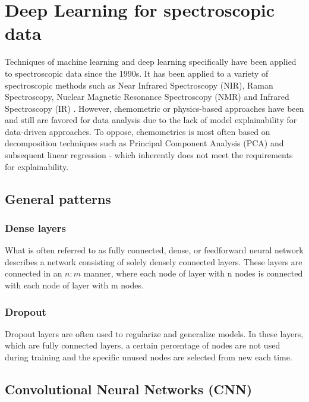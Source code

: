 \label{DL_theory}
\section{Deep Learning for spectroscopic data}

Techniques of machine learning and deep learning specifically have been applied to spectroscopic data since the 1990s. It has been applied to a variety of spectroscopic methods such as Near Infrared Spectroscopy (NIR), Raman Spectroscopy, Nuclear Magnetic Resonance Spectroscopy (NMR) and Infrared Spectroscopy (IR) . However, chemometric or physics-based approaches have been and still are favored for data analysis due to the lack of model explainability for data-driven approaches. To oppose, chemometrics is most often based on decomposition techniques such as Principal Component Analysis (PCA) and subsequent linear regression - which inherently does not meet the requirements for explainability.


\subsection{General patterns}

\subsubsection{Dense layers}
What is often referred to as fully connected, dense, or feedforward neural network describes a network consisting of solely densely connected layers. These layers are connected in an $n:m$ manner, where each node of layer with n nodes is connected with each node of layer with m nodes.


\subsubsection{Dropout}
Dropout layers are often used to regularize and generalize models. In these layers, which are fully connected layers, a certain percentage of nodes are not used during training and the specific unused nodes are selected from new each time.

\subsubsection{}

\subsection{Convolutional Neural Networks (CNN)}

